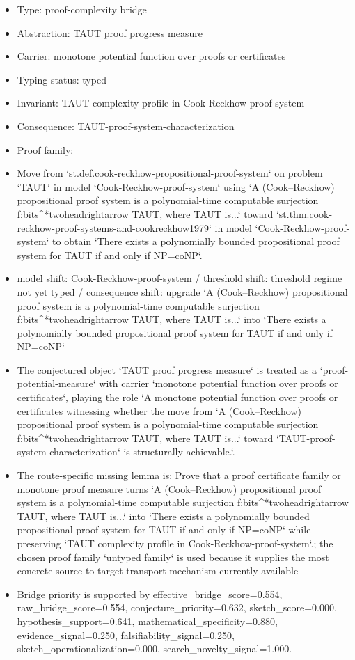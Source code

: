 \documentclass[11pt]{article}
\begin{document}
\begin{itemize}
\item Type: proof-complexity bridge
\item Abstraction: TAUT proof progress measure
\item Carrier: monotone potential function over proofs or certificates
\item Typing status: typed
\item Invariant: TAUT complexity profile in Cook-Reckhow-proof-system
\item Consequence: TAUT-proof-system-characterization
\item Proof family: 
\item Move from `st.def.cook-reckhow-propositional-proof-system` on problem `TAUT` in model `Cook-Reckhow-proof-system` using `A (Cook--Reckhow) propositional proof system is a polynomial-time computable surjection f:bits\textasciicircum{}*twoheadrightarrow TAUT, where TAUT is...` toward `st.thm.cook-reckhow-proof-systems-and-cookreckhow1979` in model `Cook-Reckhow-proof-system` to obtain `There exists a polynomially bounded propositional proof system for TAUT if and only if NP=coNP`.
\item model shift: Cook-Reckhow-proof-system / threshold shift: threshold regime not yet typed / consequence shift: upgrade `A (Cook--Reckhow) propositional proof system is a polynomial-time computable surjection f:bits\textasciicircum{}*twoheadrightarrow TAUT, where TAUT is...` into `There exists a polynomially bounded propositional proof system for TAUT if and only if NP=coNP`
\item The conjectured object `TAUT proof progress measure` is treated as a `proof-potential-measure` with carrier `monotone potential function over proofs or certificates`, playing the role `A monotone potential function over proofs or certificates witnessing whether the move from `A (Cook--Reckhow) propositional proof system is a polynomial-time computable surjection f:bits\textasciicircum{}*twoheadrightarrow TAUT, where TAUT is...` toward `TAUT-proof-system-characterization` is structurally achievable.`.
\item The route-specific missing lemma is: Prove that a proof certificate family or monotone proof measure turns `A (Cook--Reckhow) propositional proof system is a polynomial-time computable surjection f:bits\textasciicircum{}*twoheadrightarrow TAUT, where TAUT is...` into `There exists a polynomially bounded propositional proof system for TAUT if and only if NP=coNP` while preserving `TAUT complexity profile in Cook-Reckhow-proof-system`.; the chosen proof family `untyped family` is used because it supplies the most concrete source-to-target transport mechanism currently available
\item Bridge priority is supported by effective\_bridge\_score=0.554, raw\_bridge\_score=0.554, conjecture\_priority=0.632, sketch\_score=0.000, hypothesis\_support=0.641, mathematical\_specificity=0.880, evidence\_signal=0.250, falsifiability\_signal=0.250, sketch\_operationalization=0.000, search\_novelty\_signal=1.000.
\end{itemize}
\end{document}
